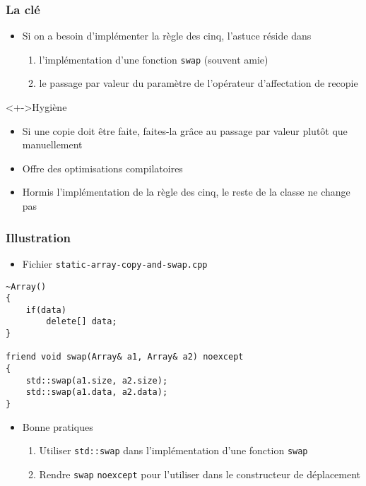 \begin{frame}
\frametitle{La clé}
\begin{itemize}[<+->]
\item Si on a besoin d'implémenter la règle des cinq, l'astuce réside dans
	\begin{enumerate}
	\item l'implémentation d'une fonction \texttt{swap} (souvent amie)
	\item le passage par valeur du paramètre de l'opérateur d'affectation de recopie
	\end{enumerate}
\end{itemize}
\begin{block}<+->{Hygiène \cpp}
	\begin{itemize}[<+->]
	\item Si une copie doit être faite, faites-la grâce au passage par valeur plutôt que manuellement
	\item Offre des optimisations compilatoires
	\end{itemize}
\end{block}
\begin{itemize}[<+->]
\item Hormis l'implémentation de la règle des cinq, le reste de la classe ne change pas
\end{itemize}
\end{frame}

\begin{frame}[containsverbatim]
\frametitle{Illustration}
\begin{itemize}
\item Fichier \texttt{static-array-copy-and-swap.cpp}
\end{itemize}
\begin{lstlisting}
~Array()
{
	if(data)
		delete[] data;
}
    
friend void swap(Array& a1, Array& a2) noexcept
{
	std::swap(a1.size, a2.size);   
	std::swap(a1.data, a2.data);   
}
\end{lstlisting}
\begin{itemize}
\item Bonne pratiques
	\begin{enumerate}
	\item Utiliser \texttt{std::swap} dans l'implémentation d'une fonction \texttt{swap}
	\item Rendre \texttt{swap} \lstinline|noexcept| pour l'utiliser dans le constructeur de déplacement
	\end{enumerate}
\end{itemize}
\end{frame}

